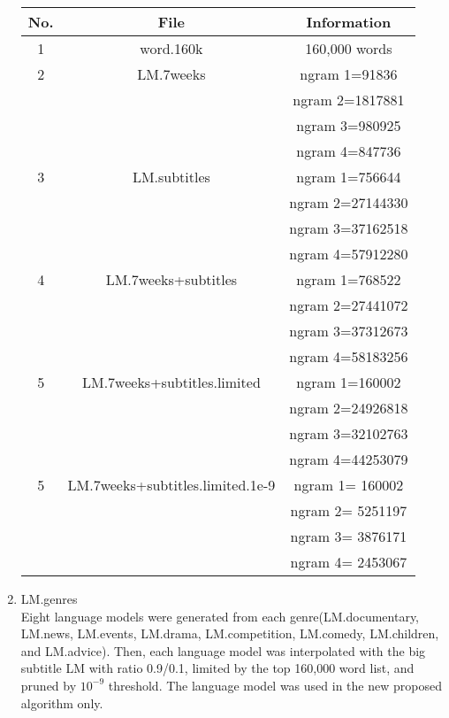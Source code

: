 \begin{enumerate}
\begin{center}
\begin{tabular}{ | c | c | c | }
\hline
\textbf{No.} & \textbf{File}  & \textbf{Information} \\ \hline \hline
1 & word.160k & 160,000 words \\  \hline
2 & LM.7weeks & ngram 1=91836 \\
 & & ngram 2=1817881 \\
 & & ngram 3=980925 \\
 & & ngram 4=847736 \\  \hline
3 & LM.subtitles & ngram 1=756644 \\
 & & ngram 2=27144330 \\
 & & ngram 3=37162518 \\
 & & ngram 4=57912280 \\ \hline
4 & LM.7weeks+subtitles & ngram 1=768522 \\
 & & ngram 2=27441072 \\
 & & ngram 3=37312673 \\
 & & ngram 4=58183256 \\ \hline
5 & LM.7weeks+subtitles.limited & ngram 1=160002 \\
 & & ngram 2=24926818 \\
 & & ngram 3=32102763 \\
 & & ngram 4=44253079 \\ \hline
5 & LM.7weeks+subtitles.limited.1e-9 &ngram  1= 160002 \\
 & & ngram  2=   5251197 \\
 & & ngram  3=   3876171 \\
 & & ngram  4=   2453067 \\ \hline
\end{tabular}
\end{center}

\item LM.genres \\
Eight language models were generated from each genre(LM.documentary, LM.news, LM.events, LM.drama, LM.competition, LM.comedy, LM.children, and LM.advice). Then, each language model was interpolated with the big subtitle LM with  ratio 0.9/0.1, limited by the top 160,000 word list, and pruned by $10^{-9}$ threshold. The language model was used in the new proposed algorithm only.


\end{enumerate}
